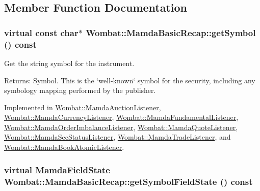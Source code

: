 \subsection{Member Function Documentation}
\hypertarget{classWombat_1_1MamdaBasicRecap_79784f420fdf399a3716a9919ab592e8}{
\subsubsection[getSymbol]{\setlength{\rightskip}{0pt plus 5cm}virtual const char$\ast$ Wombat::Mamda\-Basic\-Recap::get\-Symbol () const}}
\label{classWombat_1_1MamdaBasicRecap_79784f420fdf399a3716a9919ab592e8}


Get the string symbol for the instrument. 

\begin{Desc}
\item[Returns:]Symbol. This is the \char`\"{}well-known\char`\"{} symbol for the security, including any symbology mapping performed by the publisher. \end{Desc}


Implemented in \hyperlink{classWombat_1_1MamdaAuctionListener_3da43832419d2b77a848b7261b3c3d34}{Wombat::Mamda\-Auction\-Listener}, \hyperlink{classWombat_1_1MamdaCurrencyListener_6c9b1053a22182c09cdfd9ac020d71b9}{Wombat::Mamda\-Currency\-Listener}, \hyperlink{classWombat_1_1MamdaFundamentalListener_0d2fdebba24d7951873278facc446865}{Wombat::Mamda\-Fundamental\-Listener}, \hyperlink{classWombat_1_1MamdaOrderImbalanceListener_de961c5bbeedc9f69136682e1adaf495}{Wombat::Mamda\-Order\-Imbalance\-Listener}, \hyperlink{classWombat_1_1MamdaQuoteListener_e94788daaae88602911d3b1a5b9ae3aa}{Wombat::Mamda\-Quote\-Listener}, \hyperlink{classWombat_1_1MamdaSecStatusListener_763d9b2fb391bc22abfe9223dd17bb8e}{Wombat::Mamda\-Sec\-Status\-Listener}, \hyperlink{classWombat_1_1MamdaTradeListener_6a4f381f676df4731509adcce8287331}{Wombat::Mamda\-Trade\-Listener}, and \hyperlink{classWombat_1_1MamdaBookAtomicListener_70cfa31bc3d1010dc24c768525dbd62c}{Wombat::Mamda\-Book\-Atomic\-Listener}.\hypertarget{classWombat_1_1MamdaBasicRecap_95a917a831265cdc29aa0e28d366108a}{
\subsubsection[getSymbolFieldState]{\setlength{\rightskip}{0pt plus 5cm}virtual \hyperlink{namespaceWombat_93aac974f2ab713554fd12a1fa3b7d2a}{Mamda\-Field\-State} Wombat::Mamda\-Basic\-Recap::get\-Symbol\-Field\-State () const}}
\label{classWombat_1_1MamdaBasicRecap_95a917a831265cdc29aa0e28d366108a}


